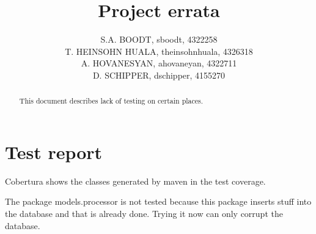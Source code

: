 \documentclass[11pt,a4paper]{report}
\author{S.A. BOODT, sboodt, 4322258\\T. HEINSOHN HUALA, theinsohnhuala, 4326318\\A. HOVANESYAN, ahovaneyan, 4322711\\D. SCHIPPER, dschipper, 4155270}
\title{Project errata}
\begin{document}
\maketitle
\begin{abstract}
This document describes lack of testing on certain places.
\end{abstract}
\tableofcontents
\chapter{Test report}
Cobertura shows the classes generated by maven in the test coverage.

The package models.processor is not tested because this package inserts stuff into the database and that is already done. Trying it now can only corrupt the database.
\end{document}
